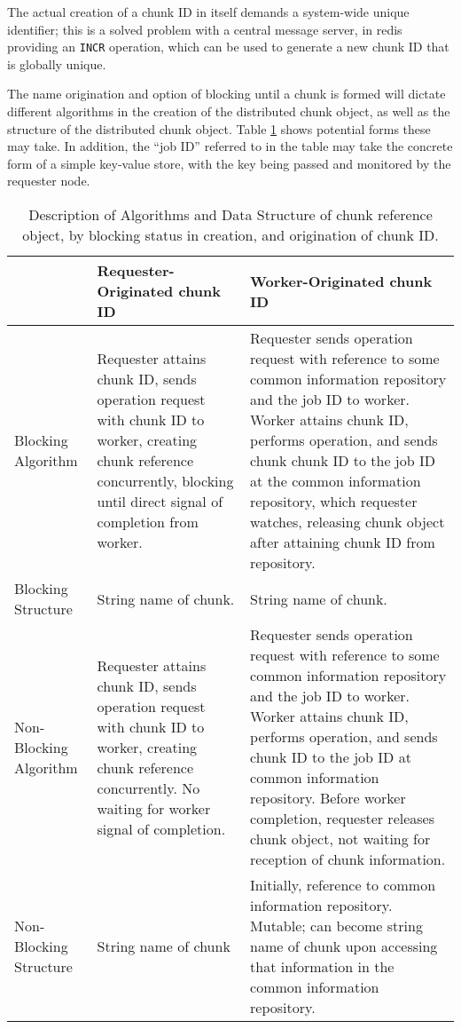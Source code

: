 \documentclass[a4paper,10pt]{article}
\begin{document}
The actual creation of a chunk ID in itself demands a system-wide unique
identifier; this is a solved problem with a central message server, in redis
providing an \texttt{INCR} operation, which can be used to generate a new chunk
ID that is globally unique.

The name origination and option of blocking until a chunk is formed will
dictate different algorithms in the creation of the distributed chunk object,
as well as the structure of the distributed chunk object.
Table \ref{tab:name-orig-block} shows potential forms these may take.
In addition, the ``job ID'' referred to in the table may
take the concrete form of a simple key-value store, with the key being passed
and monitored by the requester node.

\begin{table}
	\centering
	\begin{tabularx}{\textwidth}{l|XX}
	\toprule
	& Requester-Originated chunk ID & Worker-Originated chunk ID \\
	\midrule
	Blocking Algorithm & 
		Requester attains chunk ID, sends operation request with
		chunk ID to worker, creating chunk reference concurrently,
		blocking until direct signal of completion from worker. & 
		Requester sends operation request with reference to some common
		information repository and the job ID to worker. Worker attains
		chunk ID, performs operation, and sends chunk chunk ID to the
		job ID at the common information repository, which requester
		watches, releasing chunk object after attaining chunk ID from
		repository. \\
	Blocking Structure & 
		String name of chunk. & 
		String name of chunk. \\
	Non-Blocking Algorithm & 
		Requester attains chunk ID, sends operation request with
		chunk ID to worker, creating chunk reference concurrently. No
		waiting for worker signal of completion. & 
		Requester sends operation request with reference to some common
		information repository and the job ID to worker. Worker attains chunk ID, performs
		operation, and sends chunk ID to the job ID at common information
		repository. Before worker completion, requester releases chunk
		object, not waiting for reception of chunk information. \\
	Non-Blocking Structure & 
		String name of chunk &
		Initially, reference to common information repository. Mutable;
		can become string name of chunk upon accessing that information
		in the common information repository. \\
	\bottomrule
\end{tabularx}
	\caption{Description of Algorithms and Data Structure of chunk
	reference object, by blocking status in creation, and origination of
	chunk ID.}
	\label{tab:name-orig-block}
\end{table}
\end{document}
